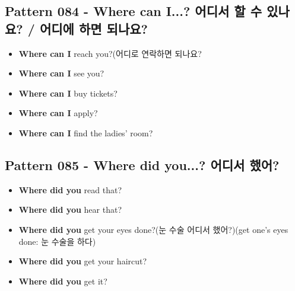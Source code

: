 \documentclass[11pt]{oblivoir}
\begin{document}
\subsection{Pattern 084 - Where can I...? 어디서 \texttildelow 할 수 있나요? / 어디에 \texttildelow 하면 되나요?}
\begin{itemize}
  \item \textbf{Where can I} reach you?(어디로 연락하면 되나요?
  \item \textbf{Where can I} see you?
  \item \textbf{Where can I} buy tickets?
  \item \textbf{Where can I} apply?
  \item \textbf{Where can I} find the ladies' room?
\end{itemize}

\subsection{Pattern 085 - Where did you...? 어디서 \texttildelow 했어?}
\begin{itemize}
  \item \textbf{Where did you} read that? 
  \item \textbf{Where did you} hear that?
  \item \textbf{Where did you} get your eyes done?(눈 수술 어디서 했어?)(get one's eyes done: 눈 수술을 하다)
  \item \textbf{Where did you} get your haircut?
  \item \textbf{Where did you} get it?
\end{itemize}
\end{document}
